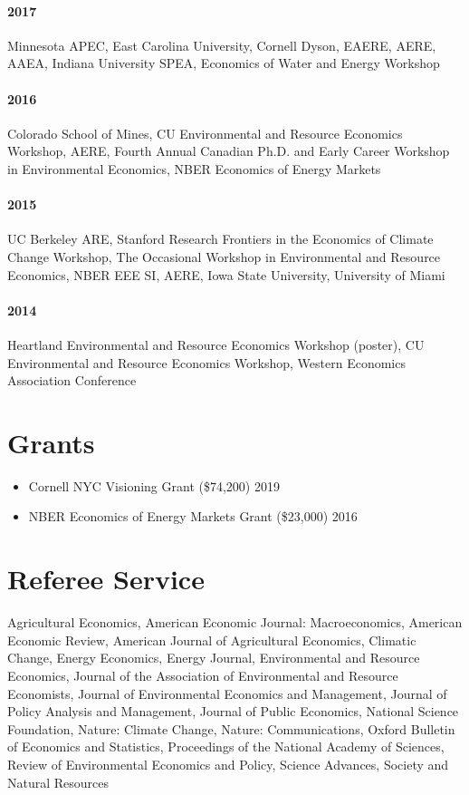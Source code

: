 \documentclass{res} %
\begin{document}
\begin{resume}
\paragraph{2017} Minnesota APEC, East Carolina University, Cornell Dyson, EAERE, AERE, AAEA, Indiana University SPEA, Economics of Water and Energy Workshop \vspace{-.3in}
\paragraph{2016} Colorado School of Mines, CU Environmental and Resource Economics Workshop, AERE, Fourth Annual Canadian Ph.D. and Early Career Workshop in Environmental Economics, NBER Economics of Energy Markets \vspace{-.3in}
\paragraph{2015} UC Berkeley ARE, Stanford Research Frontiers in the Economics of Climate Change Workshop, The Occasional Workshop in Environmental and Resource Economics, NBER EEE SI, AERE, Iowa State University, University of Miami \vspace{-.3in}
\paragraph{2014} Heartland Environmental and Resource Economics Workshop (poster), CU Environmental and Resource Economics Workshop, Western Economics Association Conference

\vspace{-.075in}
\section{Grants}
	\begin{itemize}  \itemsep -1pt
		\item[] Cornell NYC Visioning Grant (\$74,200) \hfill 2019
		\item[] NBER Economics of Energy Markets Grant (\$23,000) \hfill 2016
	\end{itemize}
\vspace{-.075in}
\section{Referee Service}
	Agricultural Economics, American Economic Journal: Macroeconomics, American Economic Review, American Journal of Agricultural Economics, Climatic Change, Energy Economics, Energy Journal, Environmental and Resource Economics, Journal of the Association of Environmental and Resource Economists, Journal of Environmental Economics and Management, Journal of Policy Analysis and Management, Journal of Public Economics, National Science Foundation, Nature: Climate Change, Nature: Communications, Oxford Bulletin of Economics and Statistics, Proceedings of the National Academy of Sciences, Review of Environmental Economics and Policy, Science Advances, Society and Natural Resources


\end{resume}
\end{document}
